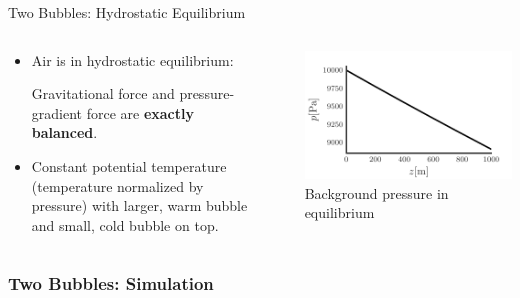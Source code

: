 \documentclass[aspectratio=169]{beamer}
\begin{document}
\begin{frame}{Two Bubbles: Hydrostatic Equilibrium}
  \begin{columns}
    \begin{column}[t]{0.5\textwidth}
      \begin{itemize}
      \item Air is in hydrostatic equilibrium:

  Gravitational force and pressure-gradient force are \textbf{exactly balanced}.

  \item Constant potential temperature (temperature normalized by pressure) with larger, warm bubble and small, cold bubble on top.
  \end{itemize}
    \end{column}~%
    \begin{column}[t]{0.5\textwidth}
      \begin{center}
          \includegraphics[trim={0 0 0 0.5cm}, clip]{ppam_hydrostatic}
Background pressure in equilibrium
\end{center}
    \end{column}
  \end{columns}
\end{frame}

\begin{frame}
  \frametitle{Two Bubbles: Simulation}
  \begin{center}
    {
 }
  \end{center}
\end{frame}
\end{document}
